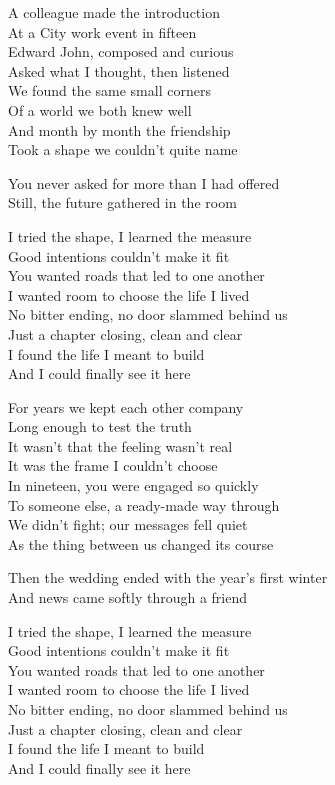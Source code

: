 \begin{lyrics}
A colleague made the introduction\\
At a City work event in fifteen\\
Edward John, composed and curious\\
Asked what I thought, then listened\\
We found the same small corners\\
Of a world we both knew well\\
And month by month the friendship\\
Took a shape we couldn’t quite name

You never asked for more than I had offered\\
Still, the future gathered in the room

I tried the shape, I learned the measure\\
Good intentions couldn’t make it fit\\
You wanted roads that led to one another\\
I wanted room to choose the life I lived\\
No bitter ending, no door slammed behind us\\
Just a chapter closing, clean and clear\\
I found the life I meant to build\\
And I could finally see it here

For years we kept each other company\\
Long enough to test the truth\\
It wasn’t that the feeling wasn’t real\\
It was the frame I couldn’t choose\\
In nineteen, you were engaged so quickly\\
To someone else, a ready-made way through\\
We didn’t fight; our messages fell quiet\\
As the thing between us changed its course

Then the wedding ended with the year’s first winter\\
And news came softly through a friend

I tried the shape, I learned the measure\\
Good intentions couldn’t make it fit\\
You wanted roads that led to one another\\
I wanted room to choose the life I lived\\
No bitter ending, no door slammed behind us\\
Just a chapter closing, clean and clear\\
I found the life I meant to build\\
And I could finally see it here


\end{lyrics}
